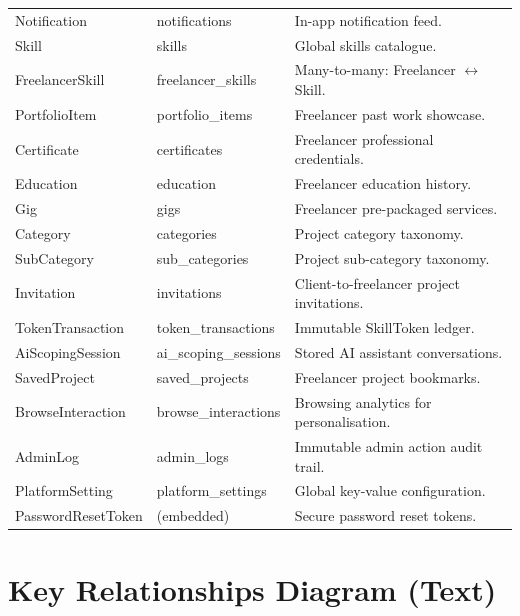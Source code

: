 \begin{table}[H]
\begin{tabularx}{\textwidth}{llX}
Notification      & notifications       & In-app notification feed. \\
Skill             & skills              & Global skills catalogue. \\
FreelancerSkill   & freelancer\_skills  & Many-to-many: Freelancer $\leftrightarrow$ Skill. \\
PortfolioItem     & portfolio\_items    & Freelancer past work showcase. \\
Certificate       & certificates        & Freelancer professional credentials. \\
Education         & education           & Freelancer education history. \\
Gig               & gigs                & Freelancer pre-packaged services. \\
Category          & categories          & Project category taxonomy. \\
SubCategory       & sub\_categories     & Project sub-category taxonomy. \\
Invitation        & invitations         & Client-to-freelancer project invitations. \\
TokenTransaction  & token\_transactions & Immutable SkillToken ledger. \\
AiScopingSession  & ai\_scoping\_sessions & Stored AI assistant conversations. \\
SavedProject      & saved\_projects     & Freelancer project bookmarks. \\
BrowseInteraction & browse\_interactions & Browsing analytics for personalisation. \\
AdminLog          & admin\_logs         & Immutable admin action audit trail. \\
PlatformSetting   & platform\_settings  & Global key-value configuration. \\
PasswordResetToken & (embedded)         & Secure password reset tokens. \\
\bottomrule
\end{tabularx}
\label{tab:schema_summary}
\end{table}

\section*{Key Relationships Diagram (Text)}

